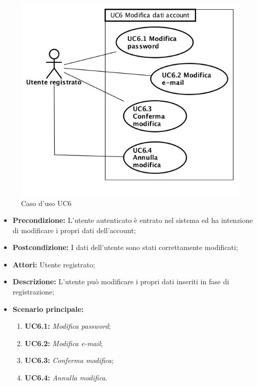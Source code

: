 \begin{figure}[h]
	\begin{center}
	\includegraphics[scale=0.6]{diagram/UC6.png}
	\caption{Caso d'uso UC6}
	\end{center}
\end{figure}
\begin{itemize}
	\item \textbf{Precondizione:} L’utente autenticato è entrato nel sistema ed ha intenzione di modificare i propri dati dell’account;
	\item \textbf{Postcondizione:} I dati dell’utente sono stati correttamente modificati;
	\item \textbf{Attori:} Utente registrato;
	\item \textbf{Descrizione:} L’utente può modificare i propri dati inseriti in fase di registrazione;
	\item \textbf{Scenario principale:}
	\begin{enumerate}
		\item \textbf{ UC6.1:} \textit{ Modifica password};
		\item \textbf{ UC6.2:} \textit{ Modifica e-mail};
		\item \textbf{ UC6.3:} \textit{ Conferma modifica};
		\item \textbf{ UC6.4:} \textit{ Annulla modifica}.
	\end{enumerate}
\end{itemize}

